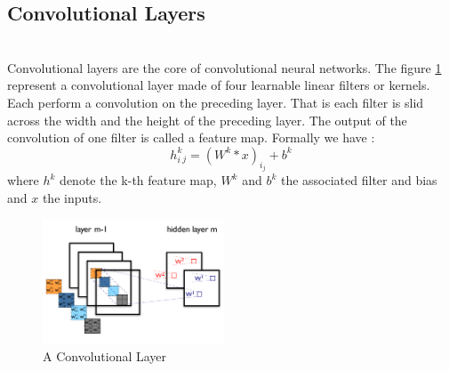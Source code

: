     \subsection{Convolutional Layers} \\

    Convolutional layers are the core of convolutional neural networks. The figure \ref{convlayer} represent a convolutional layer made of four learnable linear filters or kernels. Each perform a convolution on the preceding layer. That is each filter is slid across the width and the height of the preceding layer. The output of the convolution of one filter is called a feature map. Formally we have : \[ h^k_i_j = (W^k * x)_i_j + b^k \] where \( h^k\) denote the k-th feature map, \( W^k \) and \( b^k \) the associated filter and bias and \( x \) the inputs.

    \begin{figure}
      \begin{center}
        \includegraphics[width=0.48\textwidth]{images/conv_layer.png}
      \end{center}
      \caption{A Convolutional Layer}
      \label{convlayer}
    \end{figure}

